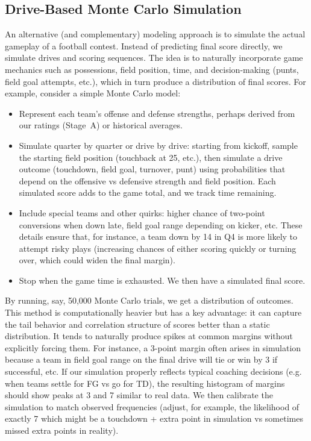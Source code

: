 \documentclass[12pt]{article}
\begin{document}
\subsection{Drive-Based Monte Carlo Simulation}
An alternative (and complementary) modeling approach is to simulate the actual gameplay of a football contest. Instead of predicting final score directly, we simulate drives and scoring sequences. The idea is to naturally incorporate game mechanics such as possessions, field position, time, and decision-making (punts, field goal attempts, etc.), which in turn produce a distribution of final scores. For example, consider a simple Monte Carlo model:
\begin{itemize}
    \item Represent each team’s offense and defense strengths, perhaps derived from our ratings (Stage~A) or historical averages.
    \item Simulate quarter by quarter or drive by drive: starting from kickoff, sample the starting field position (touchback at 25, etc.), then simulate a drive outcome (touchdown, field goal, turnover, punt) using probabilities that depend on the offensive vs defensive strength and field position. Each simulated score adds to the game total, and we track time remaining.
    \item Include special teams and other quirks: higher chance of two-point conversions when down late, field goal range depending on kicker, etc. These details ensure that, for instance, a team down by 14 in Q4 is more likely to attempt risky plays (increasing chances of either scoring quickly or turning over, which could widen the final margin).
    \item Stop when the game time is exhausted. We then have a simulated final score.
\end{itemize}
By running, say, 50,000 Monte Carlo trials, we get a distribution of outcomes. This method is computationally heavier but has a key advantage: it can capture the tail behavior and correlation structure of scores better than a static distribution. It tends to naturally produce spikes at common margins without explicitly forcing them. For instance, a 3-point margin often arises in simulation because a team in field goal range on the final drive will tie or win by 3 if successful, etc. If our simulation properly reflects typical coaching decisions (e.g. when teams settle for FG vs go for TD), the resulting histogram of margins should show peaks at 3 and 7 similar to real data. We then calibrate the simulation to match observed frequencies (adjust, for example, the likelihood of exactly 7 which might be a touchdown + extra point in simulation vs sometimes missed extra points in reality).
\end{document}
